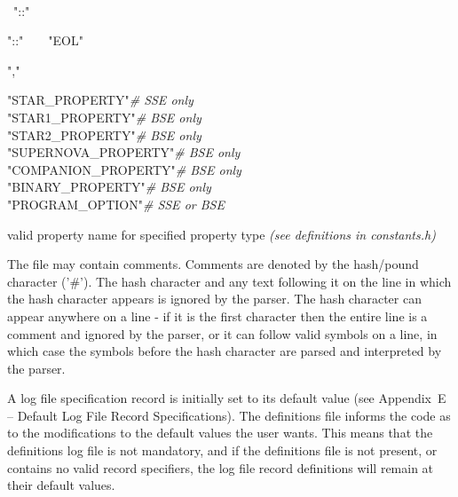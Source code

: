 \begin{minipage}{\dimexpr\textwidth-2em}
    \rab\tabto{7em}{::=}\tabto{9em}\rab\ \lsb\ \rab\  \rab\ \rsb

    \rab\tabto{7em}{::=}\tabto{9em}\rab\ "::"\ \rab\  \rab

    \rab\tabto{7em}{::=}\tabto{9em}"::"\ \ \textbar\ \ "EOL"

    \rab\tabto{7em}{::=}\tabto{9em}","\ \ \textbar\ \ \rab

    \rab\tabto{7em}{::=}\tabto{9em}"STAR\_PROPERTY"\tabto{23em}\textbar\tabto{28em}\textit{\# SSE only} \\
    \tabto{9em}"STAR1\_PROPERTY"\tabto{23em}\textbar\tabto{28em}\textit{\# BSE only} \\
    \tabto{9em}"STAR2\_PROPERTY"\tabto{23em}\textbar\tabto{28em}\textit{\# BSE only} \\
    \tabto{9em}"SUPERNOVA\_PROPERTY"\tabto{23em}\textbar\tabto{28em}\textit{\# BSE only} \\
    \tabto{9em}"COMPANION\_PROPERTY"\tabto{23em}\textbar\tabto{28em}\textit{\# BSE only} \\
    \tabto{9em}"BINARY\_PROPERTY"\tabto{23em}\textbar\tabto{28em}\textit{\# BSE only} \\
    \tabto{9em}"PROGRAM\_OPTION"\tabto{23em}\textbar\tabto{28em}\textit{\# SSE or BSE}

    \rab\tabto{7em}{::=}\tabto{9em}valid property name for specified property type \textit{(see definitions in constants.h)}
\end{minipage}

\newpage
The file may contain comments. Comments are denoted by the hash/pound character ('\#'). The hash character and any text following it on the line in which the hash character appears is ignored by the parser. The hash character can appear anywhere on a line - if it is the first character then the entire line is a comment and ignored by the parser, or it can follow valid symbols on a line, in which case the symbols before the hash character are parsed and interpreted by the parser.

A log file specification record is initially set to its default value (see Appendix~E -- Default Log File Record Specifications). The definitions file informs the code as to the modifications to the default values the user wants. This means that the definitions log file is not mandatory, and if the definitions file is not present, or contains no valid record specifiers, the log file record definitions will remain at their default values.

